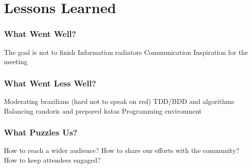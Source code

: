\section{Lessons Learned}\label{sec:lessons_learned}

\subsubsection{What Went Well?}\label{ssub:well}
The goal is not to finish
Information radiators
Communication
Inspiration for the meeting

\subsubsection{What Went Less Well?}\label{ssub:less_well}
Moderating brazilians (hard not to speak on red)
TDD/BDD and algorithms
Balancing randoris and prepared katas
Programming environment

\subsubsection{What Puzzles Us?}\label{ssub:puzzles}
How to reach a wider audience?
How to share our efforts with the community?
How to keep attendees engaged?